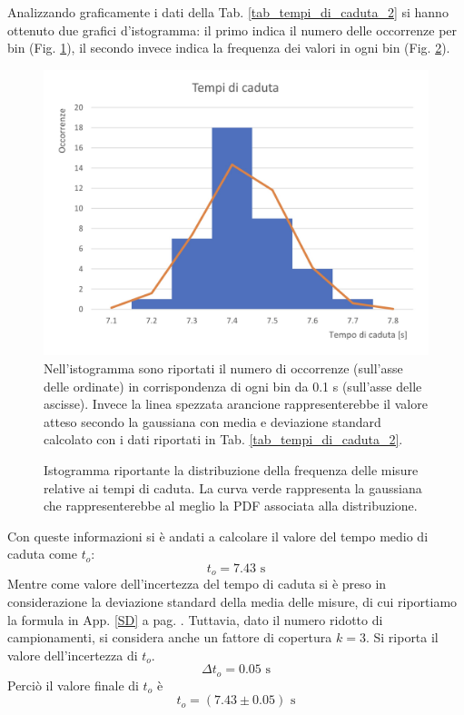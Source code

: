 Analizzando graficamente i dati della Tab. \ref{tab_tempi_di_caduta_2} si hanno ottenuto due grafici d'istogramma: il primo indica il numero delle occorrenze per bin (Fig. \ref{istogramma_tempi_di_caduta}), il secondo invece indica la frequenza dei valori in ogni bin (Fig. \ref{distribuzione_tempi_di_caduta}).
     \begin{figure}[htbp]
        \centering
        \includegraphics[width=\textwidth]{image/Istogramma_tempi_di_caduta.jpeg}
        \caption[\small L'istogramma del conteggio dei tempi di caduta del disco.]{\small Nell'istogramma sono riportati il numero di occorrenze (sull'asse delle ordinate) in corrispondenza di ogni bin da 0.1 s (sull'asse delle ascisse). Invece la linea spezzata arancione rappresenterebbe il valore atteso secondo la gaussiana con media e deviazione standard calcolato con i dati riportati in Tab. \ref{tab_tempi_di_caduta_2}.}
        \label{istogramma_tempi_di_caduta}
    \end{figure}
    
    \begin{figure}[htbp]
        \centering
        
        \caption[\small L'istogramma della distribuzione dei tempi di caduta del disco.]{\small Istogramma riportante la distribuzione della frequenza delle misure relative ai tempi di caduta. La curva verde rappresenta la gaussiana che rappresenterebbe al meglio la PDF associata alla distribuzione.}
        \label{distribuzione_tempi_di_caduta}
    \end{figure}

Con queste informazioni si è andati a calcolare il valore del tempo medio di caduta come $t_o$:
$$t_o = 7.43 \textrm{ s}$$
Mentre come valore dell'incertezza del tempo di caduta si è preso in considerazione la deviazione standard della media delle misure, di cui riportiamo la formula in App. \ref{SD} a pag. \pageref{SD}. Tuttavia, dato il numero ridotto di campionamenti, si considera anche un fattore di copertura $k=3$. Si riporta il valore dell'incertezza di $t_o$.
$$\Delta t_o = 0.05 \textrm{ s}$$
Perciò il valore finale di $t_o$ è
$$\displaystyle t_o = (7.43 \pm 0.05) \textrm{ s}$$\\

